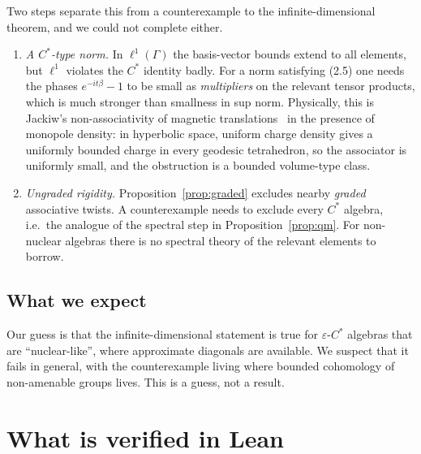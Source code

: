 \documentclass[11pt]{article}
\theoremstyle{remark}
\newcommand{\eps}{\varepsilon}
\begin{document}
Two steps separate this from a counterexample to the infinite-dimensional theorem, and we could not complete either.
\begin{enumerate}
\item \emph{A $C^*$-type norm.} In $\ell^1(\Gamma)$ the basis-vector bounds extend to all elements, but $\ell^1$ violates the $C^*$ identity badly. For a norm satisfying (2.5) one needs the phases $e^{-it\beta}-1$ to be small as \emph{multipliers} on the relevant tensor products, which is much stronger than smallness in sup norm. Physically, this is Jackiw's non-associativity of magnetic translations~\cite{Jackiw} in the presence of monopole density: in hyperbolic space, uniform charge density gives a uniformly bounded charge in every geodesic tetrahedron, so the associator is uniformly small, and the obstruction is a bounded volume-type class.
\item \emph{Ungraded rigidity.} Proposition~\ref{prop:graded} excludes nearby \emph{graded} associative twists. A counterexample needs to exclude every $C^*$ algebra, i.e.\ the analogue of the spectral step in Proposition~\ref{prop:qm}. For non-nuclear algebras there is no spectral theory of the relevant elements to borrow.
\end{enumerate}

\subsection{What we expect}

Our guess is that the infinite-dimensional statement is true for $\eps$-$C^*$ algebras that are ``nuclear-like'', where approximate diagonals are available. We suspect that it fails in general, with the counterexample living where bounded cohomology of non-amenable groups lives. This is a guess, not a result.

\section{What is verified in Lean}\label{sec:lean}
\end{document}
